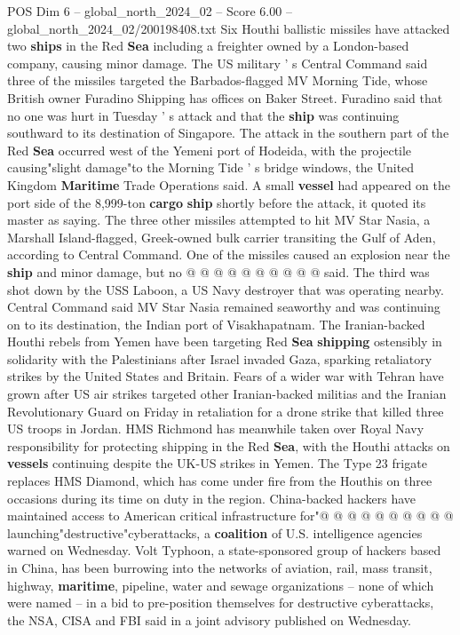 \begin{textsample}{POS Dim 6 – global\_north\_2024\_02 – Score 6.00 – global\_north\_2024\_02/200198408.txt}  \label{ex:f6_pos_180}
Six Houthi ballistic missiles have attacked two \textbf{ships} in the Red \textbf{Sea} including a freighter owned by a London-based company, causing minor damage.
The US military ' s Central Command said three of the missiles targeted the Barbados-flagged MV Morning Tide, whose British owner Furadino Shipping has offices on Baker Street.
Furadino said that no one was hurt in Tuesday ' s attack and that the \textbf{ship} was continuing southward to its destination of Singapore.
The attack in the southern part of the Red \textbf{Sea} occurred west of the Yemeni port of Hodeida, with the projectile causing"slight damage"to the Morning Tide ' s bridge windows, the United Kingdom \textbf{Maritime} Trade Operations said.
A small \textbf{vessel} had appeared on the port side of the 8,999-ton \textbf{cargo} \textbf{ship} shortly before the attack, it quoted its master as saying.
The three other missiles attempted to hit MV Star Nasia, a Marshall Island-flagged, Greek-owned bulk carrier transiting the Gulf of Aden, according to Central Command.
One of the missiles caused an explosion near the \textbf{ship} and minor damage, but no @ @ @ @ @ @ @ @ @ @ said.
The third was shot down by the USS Laboon, a US Navy destroyer that was operating nearby.
Central Command said MV Star Nasia remained seaworthy and was continuing on to its destination, the Indian port of Visakhapatnam.
The Iranian-backed Houthi rebels from Yemen have been targeting Red \textbf{Sea} \textbf{shipping} ostensibly in solidarity with the Palestinians after Israel invaded Gaza, sparking retaliatory strikes by the United States and Britain.
Fears of a wider war with Tehran have grown after US air strikes targeted other Iranian-backed militias and the Iranian Revolutionary Guard on Friday in retaliation for a drone strike that killed three US troops in Jordan.
HMS Richmond has meanwhile taken over Royal Navy responsibility for protecting shipping in the Red \textbf{Sea}, with the Houthi attacks on \textbf{vessels} continuing despite the UK-US strikes in Yemen.
The Type 23 frigate replaces HMS Diamond, which has come under fire from the Houthis on three occasions during its time on duty in the region.
China-backed hackers have maintained access to American critical infrastructure for"@ @ @ @ @ @ @ @ @ @ launching"destructive"cyberattacks, a \textbf{coalition} of U.S. intelligence agencies warned on Wednesday.
Volt Typhoon, a state-sponsored group of hackers based in China, has been burrowing into the networks of aviation, rail, mass transit, highway, \textbf{maritime}, pipeline, water and sewage organizations -- none of which were named -- in a bid to pre-position themselves for destructive cyberattacks, the NSA, CISA and FBI said in a joint advisory published on Wednesday.

\end{textsample}
